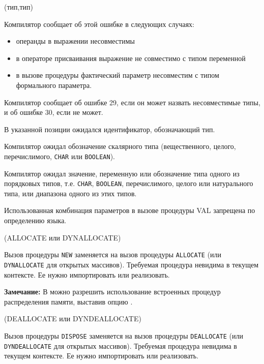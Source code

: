 (тип,тип)

Компилятор сообщает об этой ошибке в следующих случаях:
\begin{itemize}
\item операнды в выражении несовместимы
\item в операторе присваивания выражение не совместимо с типом переменной
\item в вызове процедуры фактический параметр несовместим с типом
формального параметра.
\end{itemize}

Компилятор сообщает об ошибке 29, если он может назвать несовместимые
типы, и об ошибке 30, если не может.


В указанной позиции ожидался идентификатор, обозначающий тип.


Компилятор ожидал обозначение скалярного типа 
(вещественного, целого, перечислимого, \verb'CHAR' или \verb'BOOLEAN').


Компилятор ожидал значение, переменную или обозначение типа одного из
порядковых типов,  т.е.
\verb'CHAR', \verb'BOOLEAN', перечислимого, целого или натурального типа,
или диапазона одного из этих типов.


Использованная комбинация параметров в вызове процедуры VAL запрещена
по определению языка.

(ALLOCATE или DYNALLOCATE)

Вызов процедуры \verb'NEW' заменяется на вызов процедуры
\verb'ALLOCATE' (или \verb'DYNALLOCATE' для открытых массивов).
Требуемая процедура невидима в текущем контексте. Ее
нужно импортировать или реализовать.

{\bf Замечание:} В \xds{} можно разрешить использование встроенных
процедур распределения памяти,
выставив опцию .

(DEALLOCATE или DYNDEALLOCATE)

Вызов процедуры \verb'DISPOSE' заменяется на вызов процедуры
\verb'DEALLOCATE' (или \verb'DYNDEALLOCATE' для открытых массивов).
Требуемая процедура невидима в текущем контексте. Ее
нужно импортировать или реализовать.

